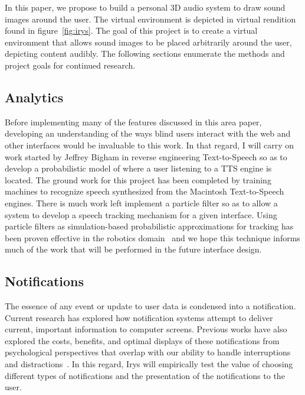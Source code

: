 In this paper, we propose to build a personal 3D audio system to draw sound
images around the user. The virtual environment is depicted in virtual rendition
found in figure~\ref{fig:irys}. The goal of this project is to create a virtual
environment that allows sound images to be placed arbitrarily around the user,
depicting content audibly.  The following sections enumerate the methods and
project goals for continued research.


\subsection{                  Analytics                                      }

Before implementing many of the features discussed in this area paper,
developing an understanding of the ways blind users interact with the web and
other interfaces would be invaluable to this work.  In that regard, I will carry
on work started by Jeffrey Bigham in reverse engineering Text-to-Speech so as
to develop a probabilistic model of where a user listening to a TTS engine is
located.  The ground work for this project has been completed by training
machines to recognize speech synthesized from the Macintosh Text-to-Speech
engines.  There is much work left implement a particle filter so as to allow a
system to develop a speech tracking mechanism for a given interface. Using
particle filters as simulation-based probabilistic approximations for tracking
has been proven effective in the robotics domain~\cite{hightower2004particle}
and we hope this technique informs much of the work that will be performed in
the future interface design.


\subsection{                  Notifications                                  }

The essence of any event or update to user data is condensed into a
notification.  Current research has explored how notification systems attempt to
deliver current, important information to computer screens.  Previous works have
also explored the costs, benefits, and optimal displays of these notifications
from psychological perspectives that overlap with our ability to handle
interruptions and distractions~\cite{McCrickard2003509,
cutrell2001notification}. In this regard, Irys will empirically test the value
of choosing different types of notifications and the presentation of the
notifications to the user.


